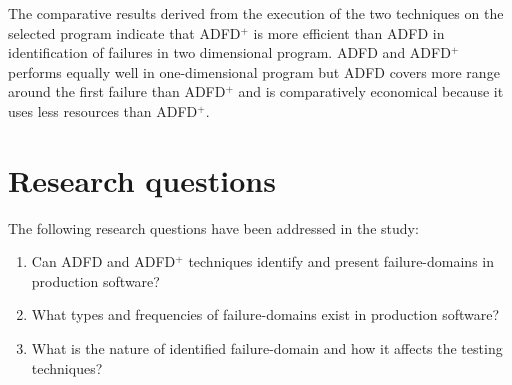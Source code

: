 The comparative results derived from the execution of the two techniques on the selected program indicate that ADFD$^+$ is more efficient than ADFD in identification of failures in two dimensional program. ADFD and ADFD$^+$ performs equally well in one-dimensional program but ADFD covers more range around the first failure than ADFD$^+$ and is comparatively economical because it uses less resources than ADFD$^+$.


\section{Research questions} \label{sec:questions}
The following research questions have been addressed in the study:
\begin{enumerate}
%
\item Can ADFD and ADFD$^+$ techniques identify and present failure-domains in production software? %

%
%
\item What types and frequencies of failure-domains exist in production software? %
%
\item What is the nature of identified failure-domain and how it affects the testing techniques? %


\end{enumerate}
